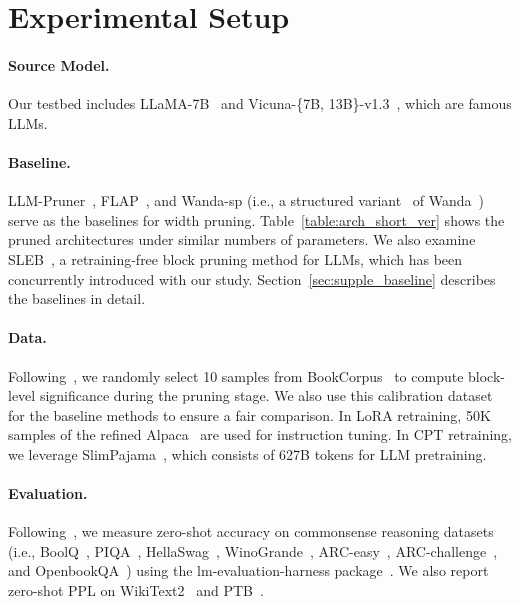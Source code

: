 \section{Experimental Setup}

\paragraph{Source Model.} Our testbed includes LLaMA-7B~\cite{touvron2023llama} and Vicuna-\{7B, 13B\}-v1.3~\cite{vicuna}, which are famous LLMs.

\paragraph{Baseline.} LLM-Pruner~\cite{llmpruner}, FLAP~\cite{flap}, and Wanda-sp (i.e., a structured variant~\cite{flap} of Wanda~\cite{wanda}) serve as the baselines for width pruning. Table~\ref{table:arch_short_ver} shows the pruned architectures under similar numbers of parameters. We also examine SLEB~\cite{song2024sleb}, a retraining-free block pruning method for LLMs, which has been concurrently introduced with our study. Section~\ref{sec:supple_baseline} describes the baselines in detail.

\paragraph{Data.} Following~\citet{llmpruner}, we randomly select 10 samples from BookCorpus~\cite{Zhu_2015_ICCV} to compute block-level significance during the pruning stage. We also use this calibration dataset for the baseline methods to ensure a fair comparison. In LoRA retraining, 50K samples of the refined Alpaca~\cite{alpaca} are used for instruction tuning. In CPT retraining, we leverage SlimPajama~\cite{cerebras2023slimpajama}, which consists of 627B tokens for LLM pretraining. 

\paragraph{Evaluation.} Following~\citet{touvron2023llama}, we measure zero-shot accuracy on commonsense reasoning datasets (i.e., BoolQ~\cite{clark-etal-2019-boolq}, PIQA~\cite{Bisk2020piqa}, HellaSwag~\cite{zellers2019hellaswag}, WinoGrande~\cite{sakaguchi2019winogrande}, ARC-easy~\cite{clark2018think}, ARC-challenge~\cite{clark2018think}, and OpenbookQA~\cite{OpenBookQA2018}) using the lm-evaluation-harness package~\cite{eval-harness}. We also report zero-shot PPL on WikiText2~\cite{wikitext2} and PTB~\cite{marcus-etal-1993-building}.

